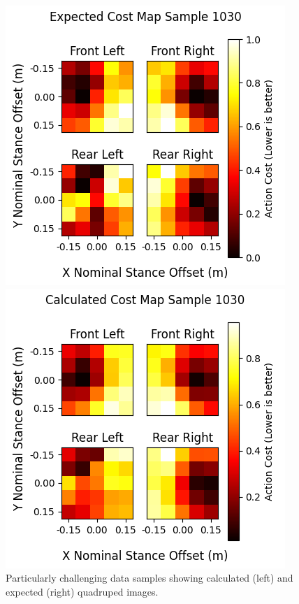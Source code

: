 \begin{figure}
  \centering
  \begin{minipage}[T]{0.45\textwidth}
    \centering
    \includegraphics[width=\textwidth]{images/data/training/challenging-expected.png}
  \end{minipage}
  \hfill
  \begin{minipage}[T]{0.45\textwidth}
    \centering
    \includegraphics[width=\textwidth]{images/data/training/challenging-calculated.png}
  \end{minipage}
  \hfill

  \caption{Particularly challenging data samples showing calculated (left) and
  expected (right) quadruped images.}
  \label{fig:data-cn-challenging-data-comparison}
\end{figure}
